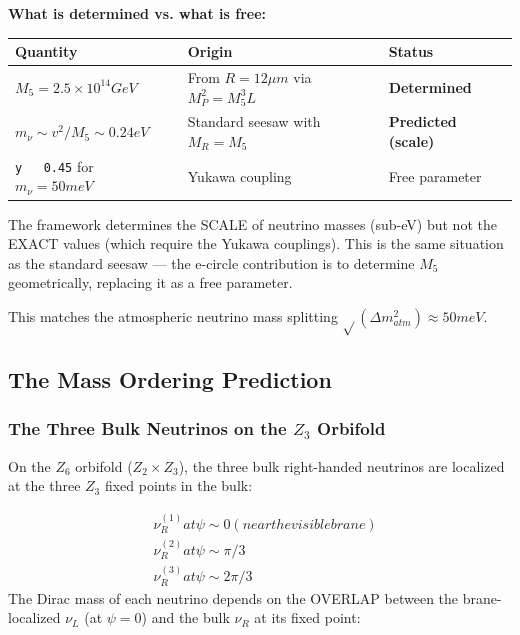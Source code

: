\documentclass[aps,prd,preprint,superscriptaddress,longbibliography,floatfix]{revtex4-2}
\theoremstyle{remark}
\begin{document}
\textbf{What is determined vs. what is free:}


\begin{table}[H]
\begin{ruledtabular}
\begin{tabular}{p{5.0cm}p{5.0cm}p{5.0cm}}
Quantity & Origin & Status \\
\hline
$M_{5} = 2.5 \times 10^{14} GeV$ & From $R = 12 \mu m$ via $M_P^{2} = M_{5}^{3} L$ & \textbf{Determined} \\
$m_\nu \sim  v^{2}/M_{5} \sim  0.24 eV$ & Standard seesaw with $M_R = M_{5}$ & \textbf{Predicted (scale)} \\
\texttt{y ~ 0.45} for $m_\nu = 50 meV$ & Yukawa coupling & Free parameter \\
\end{tabular}
\end{ruledtabular}
\end{table}

The framework determines the SCALE of neutrino masses (sub-eV) but not the EXACT values (which require the Yukawa couplings). This is the same situation as the standard seesaw --- the e-circle contribution is to determine $M_{5}$ geometrically, replacing it as a free parameter.

This matches the atmospheric neutrino mass splitting $\sqrt{}(\Delta m^{2}_{atm}) \approx 50 meV$.


\subsection{The Mass Ordering Prediction}


\subsubsection{The Three Bulk Neutrinos on the $Z_{3}$ Orbifold}

On the $Z_{6}$ orbifold ($Z_{2} \times Z_{3}$), the three bulk right-handed neutrinos are localized at the three $Z_{3}$ fixed points in the bulk:


\begin{align}
    & \nu_R^{(1)} at \psi \sim  0 (near the visible brane) \\
    & \nu_R^{(2)} at \psi \sim  \pi/3 \\
    & \nu_R^{(3)} at \psi \sim  2\pi/3
\end{align}
The Dirac mass of each neutrino depends on the OVERLAP between the brane-localized $\nu_L$ (at $\psi = 0$) and the bulk $\nu_R$ at its fixed point:
\end{document}
